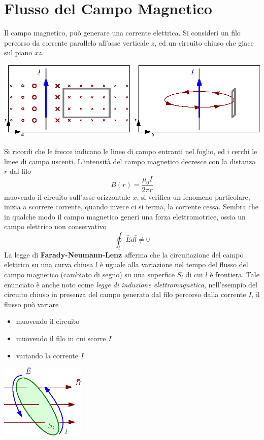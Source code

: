 \documentclass[10pt, letterpaper]{report}
\begin{document}
 \section{Flusso del Campo Magnetico}
 Il campo magnetico, può generare una corrente elettrica. Si consideri un filo percorso da corrente parallelo all'asse verticale $z$, ed un circuito chiuso che giace sul piano $xz$.
 \begin{center}
    \includegraphics[width=\textwidth ]{images/Faraday.eps}
\end{center}
Si ricordi che le frecce indicano le linee di campo entranti nel foglio, ed i cerchi le linee di campo uscenti. L'intensità del campo magnetico decresce con la distanza $r$ dal filo 
$$ B(r)=\frac{\mu_0I}{2\pi r}$$
muovendo il circuito sull'asse orizzontale $x$, si verifica un fenomeno particolare, inizia a scorrere corrente, quando invece ci si ferma, la corrente cessa. \acc 
Sembra che in qualche modo il campo magnetico generi una forza elettromotrice, ossia un campo elettrico non conservativo $$ \oint_l \bar E d\bar l \ne 0$$
\teo{} La legge di \textbf{Farady-Neumann-Lenz} afferma che la circuitazione del campo elettrico su una curva chiusa $l$ è uguale alla variazione nel tempo del flusso del campo magnetico (cambiato di segno) su una superfice $S_l$ di cui $l$ è frontiera.
Tale enunciato è anche noto come \textit{legge di induzione elettromagnetica},  nell'esempio del circuito chiuso in presenza del campo generato dal filo percorso dalla corrente $I$, il flusso può variare\begin{itemize}
    \item muovendo il circuito 
    \item muovendo il filo in cui scorre $I$
    \item variando la corrente $I$
\end{itemize}
\begin{center}
    \includegraphics[width=0.3\textwidth ]{images/Faraday2.eps}
\end{center}
\end{document}
